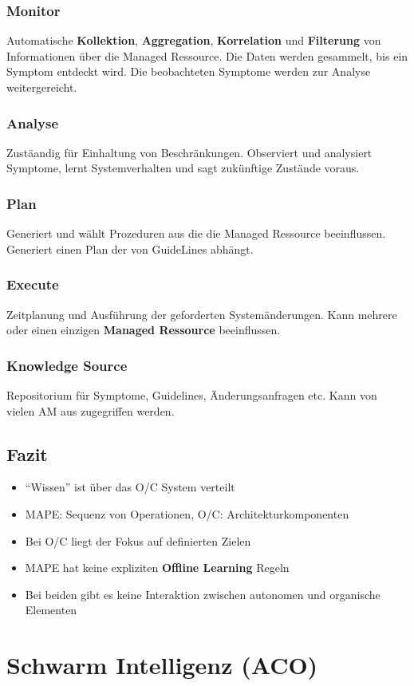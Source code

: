 \documentclass[a4paper]{article}
\begin{document}
\subsubsection{Monitor}
Automatische \textbf{Kollektion}, \textbf{Aggregation}, \textbf{Korrelation} und \textbf{Filterung} von Informationen über die Managed Ressource. Die Daten werden gesammelt, bis ein Symptom entdeckt wird. Die beobachteten Symptome werden zur Analyse weitergereicht.
\subsubsection{Analyse}
Zustäandig für Einhaltung von Beschränkungen. Observiert und analysiert Symptome, lernt Systemverhalten und sagt zukünftige Zustände voraus.
\subsubsection{Plan}
Generiert und wählt Prozeduren aus die die Managed Ressource beeinflussen. Generiert einen Plan der von GuideLines abhängt.
\subsubsection{Execute}
Zeitplanung und Ausführung der geforderten Systemänderungen. Kann mehrere oder einen einzigen \textbf{Managed Ressource} beeinflussen.
\subsubsection{Knowledge Source}
Repositorium für Symptome, Guidelines, Änderungsanfragen etc. Kann von vielen AM aus zugegriffen werden.
\subsection{Fazit}
\begin{itemize}
	\item ``Wissen'' ist über das O/C System verteilt
	\item MAPE: Sequenz von Operationen, O/C: Architekturkomponenten
	\item Bei O/C liegt der Fokus auf definierten Zielen
	\item MAPE hat keine expliziten \textbf{Offline Learning} Regeln
	\item Bei beiden gibt es keine Interaktion zwischen autonomen und organische Elementen
\end{itemize}	
\newpage

\section{Schwarm Intelligenz (ACO)}
	
	
	
	
	
	
\end{document}

